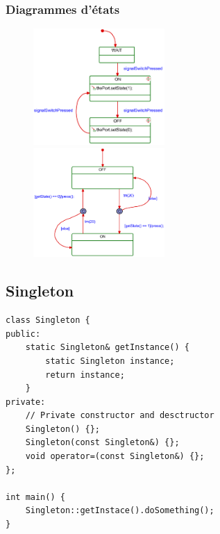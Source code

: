 \documentclass[resume]{subfiles}
\begin{document}
\subsubsection{Diagrammes d'états}
\begin{figure}[H]
\centering
\includegraphics[width=5cm]{img_1.pdf}\\
\includegraphics[width=5cm]{img_2.pdf}
\end{figure}

\subsection{Singleton}
\begin{lstlisting}[style=Cpp]
class Singleton {
public:
	static Singleton& getInstance() {
		static Singleton instance;
		return instance;
	}
private:
	// Private constructor and desctructor
	Singleton() {};
	Singleton(const Singleton&) {};
	void operator=(const Singleton&) {};
};

int main() {
	Singleton::getInstace().doSomething();
}
\end{lstlisting}
\end{document}
